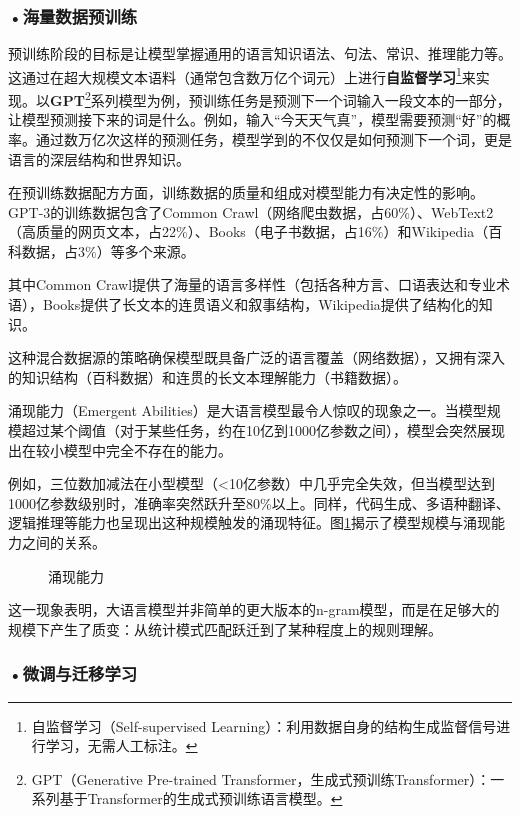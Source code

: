 \subsubsection*{\textbf{•海量数据预训练}}

预训练阶段的目标是让模型掌握通用的语言知识语法、句法、常识、推理能力等。这通过在超大规模文本语料（通常包含数万亿个词元）上进行\textbf{自监督学习}\footnote{自监督学习（Self-supervised Learning）：利用数据自身的结构生成监督信号进行学习，无需人工标注。}来实现。以\textbf{GPT}\footnote{GPT（Generative Pre-trained Transformer，生成式预训练Transformer）：一系列基于Transformer的生成式预训练语言模型。}系列模型为例，预训练任务是预测下一个词输入一段文本的一部分，让模型预测接下来的词是什么。例如，输入“今天天气真”，模型需要预测“好”的概率。通过数万亿次这样的预测任务，模型学到的不仅仅是如何预测下一个词，更是语言的深层结构和世界知识。

在预训练数据配方方面，训练数据的质量和组成对模型能力有决定性的影响。GPT-3的训练数据包含了Common Crawl（网络爬虫数据，占60\%）、WebText2（高质量的网页文本，占22\%）、Books（电子书数据，占16\%）和Wikipedia（百科数据，占3\%）等多个来源。

其中Common Crawl提供了海量的语言多样性（包括各种方言、口语表达和专业术语），Books提供了长文本的连贯语义和叙事结构，Wikipedia提供了结构化的知识。

这种混合数据源的策略确保模型既具备广泛的语言覆盖（网络数据），又拥有深入的知识结构（百科数据）和连贯的长文本理解能力（书籍数据）。

涌现能力（Emergent Abilities）是大语言模型最令人惊叹的现象之一。当模型规模超过某个阈值（对于某些任务，约在10亿到1000亿参数之间），模型会突然展现出在较小模型中完全不存在的能力。

例如，三位数加减法在小型模型（<10亿参数）中几乎完全失效，但当模型达到1000亿参数级别时，准确率突然跃升至80\%以上。同样，代码生成、多语种翻译、逻辑推理等能力也呈现出这种规模触发的涌现特征。图\ref{fig:ch2_2_26}揭示了模型规模与涌现能力之间的关系。

\begin{figure}[H]
\centering
{}
\caption{涌现能力}
\label{fig:ch2_2_26}
\end{figure}

这一现象表明，大语言模型并非简单的更大版本的n-gram模型，而是在足够大的规模下产生了质变：从统计模式匹配跃迁到了某种程度上的规则理解。

\subsubsection*{\textbf{•微调与迁移学习}}

